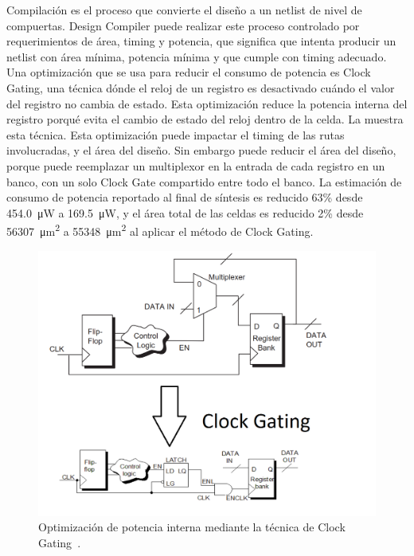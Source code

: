 \documentclass[a4paper, twoside, 11pt]{report}
\begin{document}
Compilación es el proceso que convierte el diseño a un netlist de nivel de compuertas. Design Compiler puede realizar este proceso controlado por requerimientos de área, timing y potencia, que significa que intenta producir un netlist con área mínima, potencia mínima y que cumple con timing adecuado. Una optimización que se usa para reducir el consumo de potencia es Clock Gating, una técnica dónde el reloj de un registro es desactivado cuándo el valor del registro no cambia de estado. Esta optimización reduce la potencia interna del registro porqué evita el cambio de estado del reloj dentro de la celda. La  muestra esta técnica. Esta optimización puede impactar el timing de las rutas involucradas, y el área del diseño. Sin embargo puede reducir el área del diseño, porque puede reemplazar un multiplexor en la entrada de cada registro en un banco, con un solo Clock Gate compartido entre todo el banco. La estimación de consumo de potencia reportado al final de síntesis es reducido 63\% desde \SI{454.0}{\micro\watt} a \SI{169.5}{\micro\watt}, y el área total de las celdas es reducido 2\% desde \SI{56307}{\micro\meter\squared} a \SI{55348}{\micro\meter\squared} al aplicar el método de Clock Gating.

\begin{figure}[htb]
  \centering
  \includegraphics[width=1.0\textwidth]{./img/clock_gating}
  \caption{Optimización de potencia interna mediante la técnica de Clock Gating~\cite[modificaciones mías]{power_compiler_ug}.}
  \label{fig:clock_gating}
\end{figure}
\end{document}
